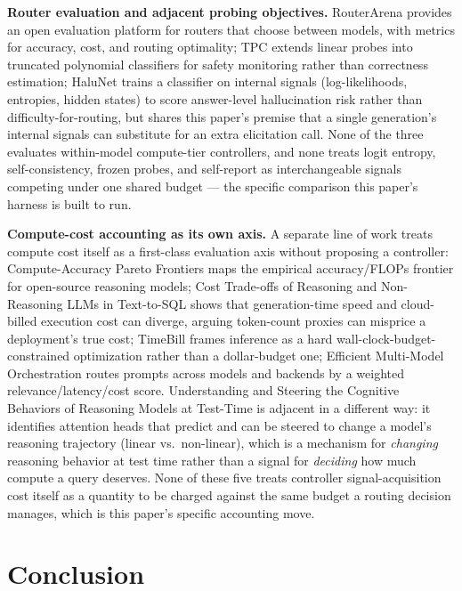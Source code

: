 \documentclass[11pt]{article}
\begin{document}
\textbf{Router evaluation and adjacent probing objectives.} RouterArena \citep{RouterArena9Hsa} provides an open evaluation platform for routers that choose between models, with metrics for accuracy, cost, and routing optimality; TPC \citep{TPCAGWa} extends linear probes into truncated polynomial classifiers for safety monitoring rather than correctness estimation; HaluNet \citep{HalunetLearning4562} trains a classifier on internal signals (log-likelihoods, entropies, hidden states) to score answer-level hallucination risk rather than difficulty-for-routing, but shares this paper's premise that a single generation's internal signals can substitute for an extra elicitation call. None of the three evaluates within-model compute-tier controllers, and none treats logit entropy, self-consistency, frozen probes, and self-report as interchangeable signals competing under one shared budget --- the specific comparison this paper's harness is built to run.

\textbf{Compute-cost accounting as its own axis.} A separate line of work treats compute cost itself as a first-class evaluation axis without proposing a controller: Compute-Accuracy Pareto Frontiers \citep{ComputeAccuracy4776} maps the empirical accuracy/FLOPs frontier for open-source reasoning models; Cost Trade-offs of Reasoning and Non-Reasoning LLMs in Text-to-SQL \citep{CostTrade2364} shows that generation-time speed and cloud-billed execution cost can diverge, arguing token-count proxies can misprice a deployment's true cost; TimeBill \citep{TimebillTime1859} frames inference as a hard wall-clock-budget-constrained optimization rather than a dollar-budget one; Efficient Multi-Model Orchestration \citep{EfficientMulti2402} routes prompts across models and backends by a weighted relevance/latency/cost score. Understanding and Steering the Cognitive Behaviors of Reasoning Models at Test-Time \citep{UnderstandingAnd4574} is adjacent in a different way: it identifies attention heads that predict and can be steered to change a model's reasoning trajectory (linear vs.\ non-linear), which is a mechanism for \emph{changing} reasoning behavior at test time rather than a signal for \emph{deciding} how much compute a query deserves. None of these five treats controller signal-acquisition cost itself as a quantity to be charged against the same budget a routing decision manages, which is this paper's specific accounting move.

\section{Conclusion}
\end{document}
